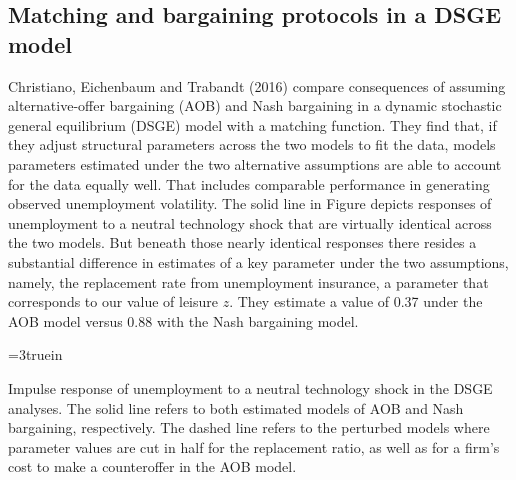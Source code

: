 \subsection{Matching and bargaining protocols in a  DSGE model}
Christiano, Eichenbaum and Trabandt (2016) compare consequences
of assuming
alternative-offer bargaining (AOB) and Nash bargaining
in a dynamic stochastic general equilibrium (DSGE)
model with a matching function. They find that,  if they adjust structural parameters across the two models  to  fit the  data,
 models parameters estimated under   the two alternative assumptions are  able to account for
the data equally well. That  includes comparable performance in   generating observed  unemployment volatility.
The solid line in Figure 
depicts responses of unemployment to a neutral technology
shock that are virtually identical across the two models.
But  beneath those nearly identical responses there resides  a substantial difference in estimates of a key parameter under
the two assumptions, namely,
the replacement rate from unemployment insurance, a parameter that
corresponds to our value of leisure $z$. They estimate a value of  0.37 under the AOB
model versus 0.88 with the Nash bargaining model.
%


\centerline{\epsfxsize=3truein}
\caption{Impulse response of unemployment to a neutral
technology shock in the DSGE analyses. The solid line refers
to both estimated models of AOB and Nash bargaining,
respectively. The
dashed line refers to the perturbed models where parameter
values are cut in half for the replacement ratio, as well as
for a firm's cost to make a counteroffer in the AOB model.}
\endfigure


